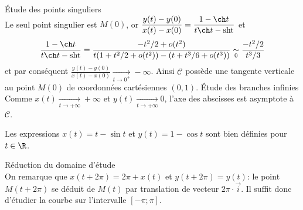 {\begin{enumerate}
{\begin{itemize}
\'Etude des points singuliers\\
Le seul point singulier est $M(0)$, or $\displaystyle \frac{y(t)-y(0)}{x(t)-x(0)}=\frac{1-\ch t}{t\ch t-\mathrm{sh t}}$ et 
$$\frac{1-\ch t}{t\ch t-\mathrm{sh t}}=\frac{-t^2/2+o(t^2)}{t(1+t^2/2+o(t^2))-(t+t^3/6+o(t^3))}\underset{0}{\sim}\frac{-t^2/2}{t^3/3}$$ 
et par conséquent $\frac{y(t)-y(0)}{x(t)-x(0)}\xrightarrow[t\to 0^+]{}-\infty$. Ainsi $\mathcal{C}$ possède une tangente verticale au point $M(0)$ de coordonnées cartésiennes $(0,1)$.
\'Etude des branches infinies\\
Comme $x(t)\xrightarrow[t\to+\infty]{}+\infty$ et $y(t)\xrightarrow[t\to+\infty]{}0$, l'axe des abscisses est asymptote à $\mathcal{C}$.
\end{itemize}

\begin{center}
\end{center}
Les expressions $x(t)=t-\sin t$ et $y(t)=1-\cos t$ sont bien définies pour $t\in\R$.
\begin{itemize}
Réduction du domaine d'étude\\
On remarque que $x(t+2\pi)=2\pi+x(t)$ et $y(t+2\pi)=y(t)$: le point $M(t+2\pi)$ 
se déduit de $M(t)$ par translation de vecteur $2\pi\cdot\vec{i}$. 
Il suffit donc d'étudier la courbe sur l'intervalle $[-\pi;\pi]$.


\end{itemize}}
\end{enumerate}}
